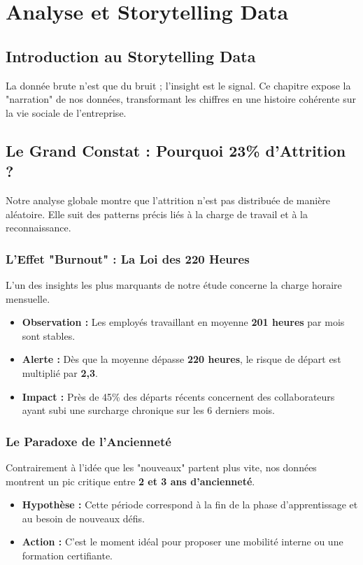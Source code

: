 \chapter{Analyse et Storytelling Data}

\section{Introduction au Storytelling Data}

La donnée brute n'est que du bruit ; l'insight est le signal. Ce chapitre expose la "narration" de nos données, transformant les chiffres en une histoire cohérente sur la vie sociale de l'entreprise.

\section{Le Grand Constat : Pourquoi 23\% d'Attrition ?}

Notre analyse globale montre que l'attrition n'est pas distribuée de manière aléatoire. Elle suit des patterns précis liés à la charge de travail et à la reconnaissance.

\subsection{L'Effet "Burnout" : La Loi des 220 Heures}
L'un des insights les plus marquants de notre étude concerne la charge horaire mensuelle.
\begin{itemize}
    \item \textbf{Observation :} Les employés travaillant en moyenne \textbf{201 heures} par mois sont stables.
    \item \textbf{Alerte :} Dès que la moyenne dépasse \textbf{220 heures}, le risque de départ est multiplié par \textbf{2,3}.
    \item \textbf{Impact :} Près de 45\% des départs récents concernent des collaborateurs ayant subi une surcharge chronique sur les 6 derniers mois.
\end{itemize}

\subsection{Le Paradoxe de l'Ancienneté}
Contrairement à l'idée que les "nouveaux" partent plus vite, nos données montrent un pic critique entre \textbf{2 et 3 ans d'ancienneté}.
\begin{itemize}
    \item \textbf{Hypothèse :} Cette période correspond à la fin de la phase d'apprentissage et au besoin de nouveaux défis.
    \item \textbf{Action :} C'est le moment idéal pour proposer une mobilité interne ou une formation certifiante.
\end{itemize}

